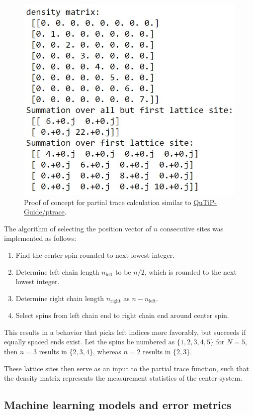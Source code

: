 \documentclass[reprint,amsmath,amssymb,aps,prb]{revtex4-2}
\begin{document}
\begin{figure}[h!]
\centering
\includegraphics[width=0.7\linewidth]{figures/partialtrace_proof_of_concept}
\caption{Proof of concept for partial trace calculation similar to \protect\hyperlink{http://qutip.org/docs/3.1.0/guide/guide-tensor.html}{QuTiP-Guide/ptrace}.}
\label{fig:partialtrace_proof_of_concept}
\end{figure}

The algorithm of selecting the position vector of $n$ consecutive sites was implemented as follows: 
\begin{enumerate}
	\item Find the center spin rounded to next lowest integer.
	\item Determine left chain length $n_\text{left}$ to be $n/2$, which is rounded to the next lowest integer.
	\item Determine right chain length $n_\text{right}$ as $n-n_\text{left}$.
	\item Select spins from left chain end to right chain end around center spin.
\end{enumerate}
This results in a behavior that picks left indices more favorably, but succeeds if equally spaced ends exist. Let the spins be numbered as $\{1, 2, 3, 4, 5\}$ for $N=5$, then  $n=3$ results in $\{2, 3, 4\}$, whereas $n=2$ results in $\{2, 3\}$.

These lattice sites then serve as an input to the partial trace function, such that the density matrix represents the measurement statistics of the center system.

\subsection{Machine learning models and error metrics}\label{sec:nn}
\end{document}
